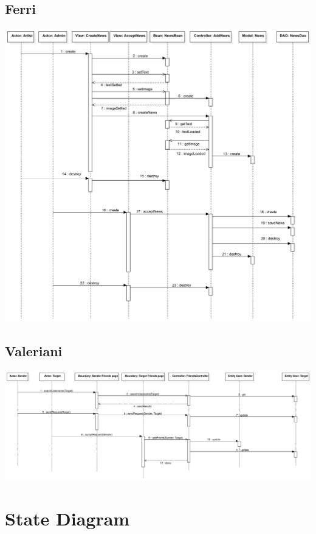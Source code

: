 \documentclass[11pt,a4paper]{article}
\begin{document}
\subsection{Ferri}
\includegraphics[scale=0.15]{SQFerri.jpg}
\subsection{Valeriani}
\includegraphics[scale=0.14]{SQValeriani.jpg}
\section{State Diagram}
\end{document}
